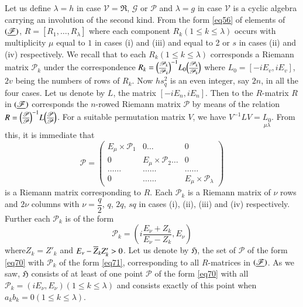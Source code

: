 Let us define $\lambda=h$ in case $\mathscr{V}=\mathfrak{R}$,
$\mathscr{G}$ or $\mathscr{P}$ and $\lambda=g$ in case $\mathscr{V}$
is a cyclic algebra carrying an involution of the second kind. From
the form \eqref{eq56} of elements of $(\underline{\mathscr{F}})$,
$R=[R_{1},\ldots,R_{\lambda}]$ where each component $R_{k}(1\leq k\leq
\lambda)$ occurs with multiplicity $\mu$ equal to $1$ in cases (i) and
(iii) and equal to 2 or $s$ in cases (ii) and (iv) respectively. We
recall that to each $R_{k}(1\leq k\leq \lambda)$ corresponds a Riemann
matrix $\mathscr{P}_{k}$ under the correspondence
$R_{k}=\binom{\mathscr{P}_{k}}{\overline{\mathscr{P}}_{k}}^{-1}L_{0}
\binom{\mathscr{P}_{k}}{\overline{\mathscr{P}_{k}}}$
  where $L_{0}=[-iE_{v}, iE_{v}]$, $2v$ being the numbers of rows of
  $R_{k}$. Now $hs^{2}_{q}$ is an even integer, say $2n$, in all the
  four cases. Let us denote by $L$, the matrix
  $[-iE_{n},iE_{n}]$. Then to the $R$-matrix $R$ in
  $(\underline{\mathscr{F}})$ corresponds the $n$-rowed Riemann matrix
  $\mathscr{P}$ by means of the relation
  $R=\binom{\mathscr{P}}{\overline{\mathscr{P}}}^{-1}L\binom{\mathscr{P}}{\overline{\mathscr{P}}}$. For
  a suitable permutation matrix $V$, we have
  $V^{-1}LV=\underset{\mu\lambda}{L_{0}}$. From this, it is immediate
  that
\begin{equation*}
\mathscr{P}=
\begin{pmatrix}
E_{\mu}\times \mathscr{P}_{1} & 0\ldots & 0\\
0 & E_{\mu}\times \mathscr{P}_{2}\ldots &  0\\
\ldots\ldots & \ldots\ldots & \ldots\ldots\\
0 & \ldots\ldots & E_{\mu}\times\mathscr{P}_{\lambda}
\end{pmatrix}\tag{70}\label{eq70}
\end{equation*}
is a Riemann matrix corresponding to $R$. Each $\mathscr{P}_{k}$ is a
Riemann matrix of $\nu$ rows and $2\nu$ columns with
$\nu=\dfrac{q}{2}$, $q$, $2q$, $sq$ in cases (i), (ii), (iii) and (iv)
respectively. Further each $\mathscr{P}_{k}$ is of the form
\begin{equation*}
\mathscr{P}_{k}=\left(i\dfrac{E_{\nu}+Z_{k}}{E_{\nu}-Z_{k}},E_{\nu}\right)\tag{71}\label{eq71} 
\end{equation*}
where\pageoriginale $Z_{k}=Z'_{k}$ and
$E_{\nu}-\overline{Z}_{k}Z'_{k}>0$. Let us denote by $\mathfrak{H}$, the set
of $\mathscr{P}$ of the form \eqref{eq70} with $\mathscr{P}_{k}$ of the
form \eqref{eq71}, corresponding to all $R$-matrices in
$(\underline{\mathscr{F}})$. As we saw, $\mathfrak{H}$ consists of at least
of one point $\mathscr{P}$ of the form \eqref{eq70} with all
$\mathscr{P}_{k}=(iE_{\nu},E_{\nu})(1\leq k\leq \lambda)$ and consists
exactly of this point when $a_{k}b_{k}=0(1\leq k\leq \lambda)$.

